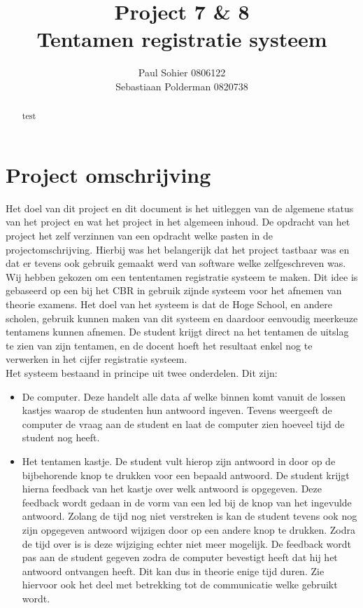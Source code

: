 \documentclass[a4paper,titlepage]{artikel1}
\author{Paul Sohier 0806122\\Sebastiaan Polderman 0820738}
\title{Project 7 \& 8\\Tentamen registratie systeem}
\begin{document}
\maketitle
\begin{abstract}
test
\end{abstract}
\tableofcontents
\newpage
\section{Project omschrijving}
Het doel van dit project en dit document is het uitleggen van de algemene status van het project en wat het project in het algemeen inhoud. De opdracht van het project het zelf verzinnen van een opdracht welke pasten in de projectomschrijving. Hierbij was het belangerijk dat het project tastbaar was en dat er tevens ook gebruik gemaakt werd van software welke zelfgeschreven was. \\
Wij hebben gekozen om een tententamen registratie systeem te maken. Dit idee is gebaseerd op een bij het CBR in gebruik zijnde systeem voor het afnemen van theorie examens. Het doel van het systeem is dat de Hoge School, en andere scholen, gebruik kunnen maken van dit systeem en daardoor eenvoudig meerkeuze tentamens kunnen afnemen. De student krijgt direct na het tentamen de uitslag te zien van zijn tentamen, en de docent hoeft het resultaat enkel nog te verwerken in het cijfer registratie systeem.\\
Het systeem bestaand in principe uit twee onderdelen. Dit zijn:
\begin{itemize}
  \item De computer. Deze handelt alle data af welke binnen komt vanuit de lossen kastjes waarop de studenten hun antwoord ingeven. Tevens weergeeft de computer de vraag aan de student en laat de computer zien hoeveel tijd de student nog heeft.
  \item Het tentamen kastje. De student vult hierop zijn antwoord in door op de bijbehorende knop te drukken voor een bepaald antwoord. De student krijgt hierna feedback van het kastje over welk antwoord is opgegeven. Deze feedback wordt gedaan in de vorm van een led bij de knop van het ingevulde antwoord. Zolang de tijd nog niet verstreken is kan de student tevens ook nog zijn opgegeven antwoord wijzigen door op een andere knop te drukken. Zodra de tijd over is is deze wijziging echter niet meer mogelijk. De feedback wordt pas aan de student gegeven zodra de computer bevestigt heeft dat hij het antwoord ontvangen heeft. Dit kan dus in theorie enige tijd duren. Zie hiervoor ook het deel met betrekking tot de communicatie welke gebruikt wordt.
\end{itemize}
\end{document}
